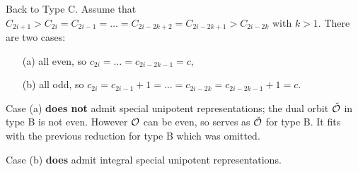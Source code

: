 \documentclass[11pt ,reqno]{amsart}
\begin{document}
\medskip
{\clrr Back to Type C}. 
Assume that $C_{2i+1}>C_{2i}=C_{2i-1}=\dots =C_{2i-2k+2}=C_{2i-2k+1}>C_{2i-2k}$
with $k>1.$ There are two cases:
\begin{itemize}
\item[(a)] all even, so $c_{2i}=\dots =c_{2i-2k-1}=c$,
\item[(b)] all odd, so $c_{2i}=c_{2i-1}+1=\dots = c_{2i-2k}=c_{2i-2k-1}+1=c.$ 
\end{itemize}
{
\noindent Case (a) \textbf{does not} admit special unipotent
representations; the dual orbit ${\check {\mathcal O}}$ in type B is not even. However $\mathcal O$
can be even, so serves as ${\check {\mathcal O}}$ for type B. It fits with the previous
reduction for type B which was omitted. 

\noindent Case (b) \textbf{does} admit integral special unipotent representations.}
\end{document}
